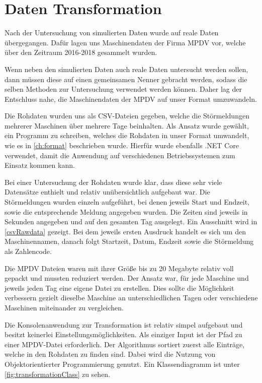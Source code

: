 \newpage
\section{Daten Transformation} \label{ch:transformation}

Nach der Untersuchung von simulierten Daten wurde auf reale Daten übergegangen. Dafür lagen uns Maschinendaten der Firma MPDV vor, welche über den Zeitraum 2016-2018 gesammelt wurden.

Wenn neben den simulierten Daten auch reale Daten untersucht werden sollen, dann müssen diese auf einen gemeinsamen Nenner gebracht werden, sodass die selben Methoden zur Untersuchung verwendet werden können. Daher lag der Entschluss nahe, die Maschinendaten der MPDV auf unser Format umzuwandeln.

Die Rohdaten wurden uns als CSV-Dateien gegeben, welche die Störmeldungen mehrerer Maschinen über mehrere Tage beinhalten. Als Ansatz wurde gewählt, ein Programm zu schreiben, welches die Rohdaten in unser Format umwandelt, wie es in \autoref{ch:format} beschrieben wurde. Hierfür wurde ebenfalls .NET Core verwendet, damit die Anwendung auf verschiedenen Betriebssystemen zum Einsatz kommen kann.

Bei einer Untersuchung der Rohdaten wurde klar, dass diese sehr viele Datensätze enthielt und relativ unübersichtlich aufgebaut war. Die Störmeldungen wurden einzeln aufgeführt, bei denen jeweils Start und Endzeit, sowie die entsprechende Meldung angegeben wurden. Die Zeiten sind jeweils in Sekunden angegeben und auf den gesamten Tag ausgelegt. Ein Ausschnitt wird in \autoref{csvRawdata} gezeigt. Bei dem jeweils ersten Ausdruck handelt es sich um den Maschinennamen, danach folgt Startzeit, Datum, Endzeit sowie die Störmeldung als Zahlencode.





Die MPDV Dateien waren mit ihrer Größe bis zu 20 Megabyte relativ voll gepackt und mussten reduziert werden. Der Ansatz war, für jede Maschine und jeweils jeden Tag eine eigene Datei zu erstellen. Dies sollte die Möglichkeit verbessern gezielt dieselbe Maschine an unterschiedlichen Tagen oder verschiedene Maschinen miteinander zu vergleichen.

Die Konsolenanwendung zur Transformation ist relativ simpel aufgebaut und besitzt keinerlei Einstellungsmöglichkeiten. Als einziger Input ist der Pfad zu einer MPDV-Datei erforderlich. Der Algorithmus sortiert zuerst alle Einträge, welche in den Rohdaten zu finden sind. Dabei wird die Nutzung von Objektorientierter Programmierung genutzt. Ein Klassendiagramm ist unter \autoref{fig:transformationClass} zu sehen.

